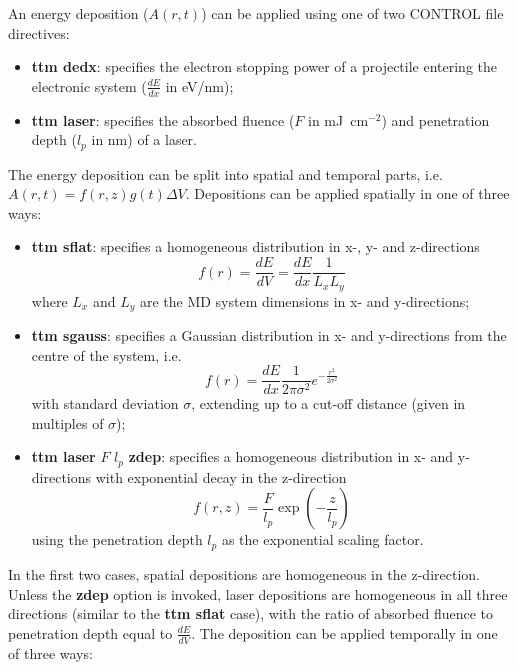 An energy deposition 
($A(r,t)$) can be applied using one of two CONTROL file directives:
\begin{itemize}
\item {\bf ttm dedx}: specifies the electron stopping power of a projectile entering the electronic system ($\frac{dE}{dx}$ in eV/nm);
\item {\bf ttm laser}: specifies the absorbed fluence ($F$ in mJ~cm$^{-2}$) and penetration depth ($l_p$ in nm) of a laser.
\end{itemize}
The energy deposition can be split into spatial and temporal parts, i.e.
$A(r,t) = f(r,z) g(t) \Delta V$. Depositions can be applied spatially in one of three ways:
\begin{itemize}
\item {\bf ttm sflat}: specifies a homogeneous distribution in x-, y- and z-directions \begin{equation*}f(r) = \frac{dE}{dV} = \frac{dE}{dx} \frac{1}{L_{x} L_{y}}\end{equation*} where $L_{x}$ and $L_{y}$ are the MD system dimensions in x- and y-directions;
\item {\bf ttm sgauss}: specifies a Gaussian distribution in x- and y-directions from the centre of the system, i.e.\begin{equation*}f(r) = \frac{dE}{dx} \frac{1}{2 \pi \sigma^2} e^{-\frac{r^2}{2\sigma^2}}\end{equation*} with standard deviation $\sigma$, extending up to a cut-off distance (given in multiples of $\sigma$);
\item {\bf ttm laser} $F$ $l_p$ {\bf zdep}: specifies a homogeneous distribution in x- and y-directions with exponential decay in the z-direction \begin{equation*}f(r,z) = \frac{F}{l_p} \exp\left(-\frac{z}{l_p}\right) \end{equation*} using the penetration depth $l_p$ as the exponential scaling factor.
\end{itemize}
In the first two cases, spatial depositions are homogeneous in the z-direction. 
Unless the {\bf zdep} option is invoked, laser depositions are homogeneous 
in all three directions (similar to the {\bf ttm sflat} case), with the ratio of 
absorbed fluence to penetration depth equal to $\frac{dE}{dV}$.
The deposition can be applied temporally in one of three ways:

